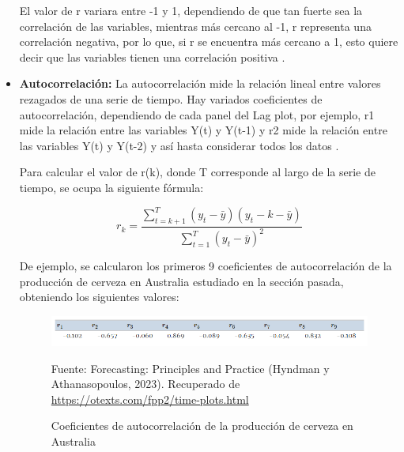 \begin{itemize}
    El valor de r variara entre -1 y 1, dependiendo de que tan fuerte sea la correlación de las variables, mientras más cercano al -1, r representa una correlación negativa, por lo que, si r se encuentra más cercano a 1, esto quiere decir que las variables tienen una correlación positiva \cite{forecast-time-series-arima}.

    \item \textbf{Autocorrelación:} La autocorrelación mide la relación lineal entre valores rezagados de una serie de tiempo. Hay variados coeficientes de autocorrelación, dependiendo de cada panel del Lag plot, por ejemplo, r1 mide la relación entre las variables Y(t) y Y(t-1) y r2 mide la relación entre las variables Y(t) y Y(t-2) y así hasta considerar todos los datos \cite{forecast-time-series-arima}.
    
    Para calcular el valor de r(k), donde T corresponde al largo de la serie de tiempo, se ocupa la siguiente fórmula:

    \begin{equation*}
        r_k = \frac{\sum_{t=k+1}^{T}{(y_t - \bar{y})(y_t-k - \bar{y})}}{\sum_{t=1}^{T}(y_t - \bar{y})^2}
    \end{equation*}  

    De ejemplo, se calcularon los primeros 9 coeficientes de autocorrelación de la producción de cerveza en Australia estudiado en la sección pasada, obteniendo los siguientes valores:

    \begin{figure}[H]
        \begin{minipage}[t]{0.9\textwidth}
            \caption{Coeficientes de autocorrelación de la producción de cerveza en Australia}
            \label{autocorrelaciones1}        
        \end{minipage}
    
        \vspace{10pt}
    
        \begin{minipage}[b]{1.1\textwidth}
            \centering
            \includegraphics[width=\textwidth]{img/ejemplo_autocorrelaciones.png}        
        \end{minipage}
    
        \begin{minipage}[t]{0.9\textwidth}
            Fuente: Forecasting: Principles and Practice (Hyndman y Athanasopoulos, 2023). Recuperado de \url{https://otexts.com/fpp2/time-plots.html}
        \end{minipage}
    \end{figure}


\end{itemize}
